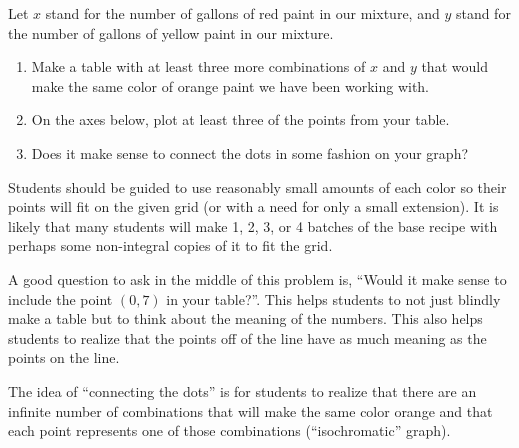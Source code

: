\documentclass[nooutcomes, handout]{ximera}
\begin{document}
\begin{question}
Let $x$ stand for the number of gallons of red paint in our mixture, and $y$ stand for the number of gallons of yellow paint in our mixture.
\begin{enumerate}
    \item Make a table with at least three more combinations of $x$ and $y$ that would make the same color of orange paint we have been working with.
    \item On the axes below, plot at least three of the points from your table.
    \item Does it make sense to connect the dots in some fashion on your graph?
\end{enumerate}


\begin{center}
\end{center}

\begin{instructorNotes}
Students should be guided to use reasonably small amounts of each color so their points will fit on the given grid (or with a need for only a small extension).  It is likely that many students will make 1, 2, 3, or 4 batches of the base recipe with perhaps some non-integral copies of it to fit the grid.

A good question to ask in the middle of this problem is, ``Would it make sense to include the point $(0,7)$ in your table?''.  This helps students to not just blindly make a table but to think about the meaning of the numbers.  This also helps students to realize that the points off of the line have as much meaning as the points on the line.

       The idea of ``connecting the dots'' is for students to realize that there are an infinite number of combinations that will make the same color orange and that each point represents one of those combinations (``isochromatic'' graph).
\end{instructorNotes}
\end{question}
\end{document}
